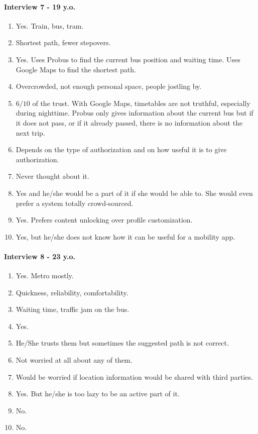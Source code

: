 \documentclass[a4paper, 10pt]{IEEEtran}
\begin{document}
\paragraph*{Interview 7 - 19 y.o.}
\begin{enumerate}
    \item Yes. Train, bus, tram.
    \item Shortest path, fewer stepovers.
    \item Yes. Uses Probus to find the current bus position and waiting time. Uses Google Maps to find the shortest path.
    \item Overcrowded, not enough personal space, people jostling by.
    \item $6/10$ of the trust. With Google Maps, timetables are not truthful, especially during nighttime. Probus only gives information about the current bus but if it does not pass, or if it already passed, there is no information about the next trip.
    \item  Depends on the type of authorization and on how useful it is to give authorization. 
    \item Never thought about it.
    \item Yes and he/she would be a part of it if she would be able to. She would even prefer a system totally crowd-sourced.
    \item Yes. Prefers content unlocking over profile customization.
    \item Yes, but he/she does not know how it can be useful for a mobility app.
\end{enumerate}

\paragraph*{Interview 8 - 23 y.o.}
\begin{enumerate}
    \item Yes. Metro mostly.
    \item Quickness, reliability, comfortability.
    \item Waiting time, traffic jam on the bus.
    \item Yes.
    \item He/She trusts them but sometimes the suggested path is not correct.
    \item Not worried at all about any of them.
    \item Would be worried if location information would be shared with third parties.
    \item Yes. But he/she is too lazy to be an active part of it.
    \item No.
    \item No.
\end{enumerate}
\end{document}
